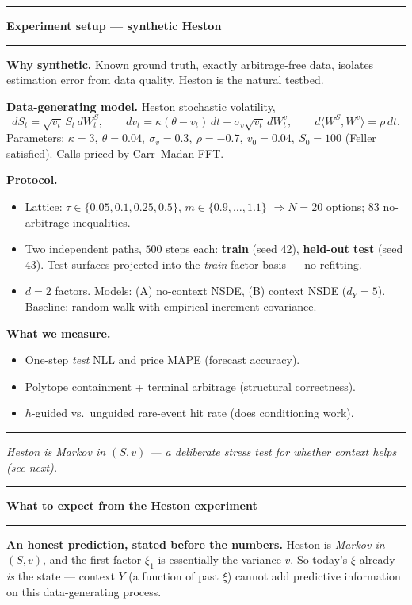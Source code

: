 \documentclass[12pt]{article}
\newcommand{\slide}[1]{%
  \par\noindent\rule{\linewidth}{1.2pt}\par\vspace{2pt}%
  {\LARGE\bfseries #1}\par\vspace{2pt}%
  \noindent\rule{\linewidth}{0.5pt}\par\vspace{8pt}}
\newcommand{\footer}[1]{\vfill\noindent\rule{\linewidth}{0.3pt}\par
  {\small\itshape #1}}
\begin{document}
\slide{Experiment setup --- synthetic Heston}

\textbf{Why synthetic.} Known ground truth, exactly arbitrage-free data,
isolates estimation error from data quality. Heston is the natural testbed.

\vspace{6pt}
\textbf{Data-generating model.} Heston stochastic volatility,
\[
dS_t = \sqrt{v_t}\,S_t\,dW_t^S,\qquad
dv_t = \kappa(\theta - v_t)\,dt + \sigma_v\sqrt{v_t}\,dW_t^v,\qquad
d\langle W^S,W^v\rangle=\rho\,dt.
\]
Parameters: $\kappa=3,\ \theta=0.04,\ \sigma_v=0.3,\ \rho=-0.7,\ v_0=0.04,\
S_0=100$ (Feller satisfied). Calls priced by Carr--Madan FFT.

\vspace{6pt}
\textbf{Protocol.}
\begin{itemize}
\item Lattice: $\tau\in\{0.05,0.1,0.25,0.5\}$, $m\in\{0.9,\dots,1.1\}$
  $\Rightarrow N=20$ options; $83$ no-arbitrage inequalities.
\item Two independent paths, $500$ steps each: \textbf{train} (seed 42),
  \textbf{held-out test} (seed 43). Test surfaces projected into the
  \emph{train} factor basis --- no refitting.
\item $d=2$ factors. Models: (A) no-context NSDE, (B) context NSDE
  ($d_Y=5$). Baseline: random walk with empirical increment covariance.
\end{itemize}

\vspace{6pt}
\textbf{What we measure.}
\begin{itemize}
\item One-step \emph{test} NLL and price MAPE (forecast accuracy).
\item Polytope containment + terminal arbitrage (structural correctness).
\item $h$-guided vs.\ unguided rare-event hit rate (does conditioning work).
\end{itemize}

\footer{Heston is Markov in $(S,v)$ --- a deliberate stress test for whether context helps (see next).}
\clearpage

\slide{What to expect from the Heston experiment}

\textbf{An honest prediction, stated before the numbers.}
Heston is \emph{Markov in $(S,v)$}, and the first factor $\xi_1$ is
essentially the variance $v$. So today's $\xi$ already \emph{is} the state
--- context $Y$ (a function of past $\xi$) cannot add predictive
information on this data-generating process.
\end{document}
